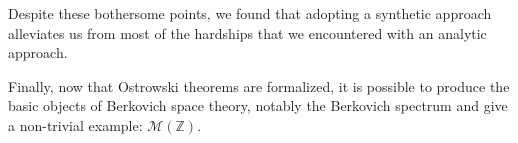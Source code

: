 \documentclass[
]{article}
\newcommand{\Z}{\mathbb{Z}}
\begin{document}
Despite these bothersome points, we found that adopting a synthetic
approach alleviates us from most of the hardships that we encountered
with an analytic approach.

Finally, now that Ostrowski theorems are formalized, it is possible to
produce the basic objects of Berkovich space theory, notably the
Berkovich spectrum and give a non-trivial example: \(\mathcal{M}(\Z)\).

\vspace*{-0.5em}

\printbibliography[title=References]
\end{document}
